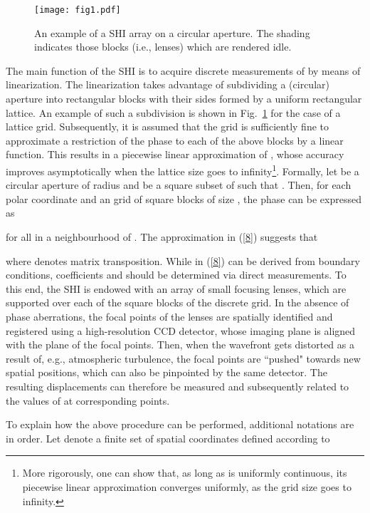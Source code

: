 \pdfoutput=1 \documentclass[journal]{IEEEtran}
\begin{document}
\begin{figure}[!t]
\begin{center}
\hspace{-5mm}\texttt{[image: fig1.pdf]}
\caption{An example of a  SHI array on a circular aperture. The shading indicates those blocks (i.e., lenses) which are rendered idle.} \label{F1}
\end{center}
\end{figure}

The main function of the SHI is to acquire discrete measurements of  by means of linearization. The linearization takes advantage of subdividing a (circular) aperture into rectangular blocks with their sides formed by a uniform rectangular lattice. An example of such a subdivision is shown in Fig.~\ref{F1} for the case of a  lattice grid. Subsequently, it is assumed that the grid is sufficiently fine to approximate a restriction of the phase  to each of the above blocks by a linear function. This results in a piecewise linear approximation of , whose accuracy improves asymptotically when the lattice size goes to infinity\footnote{More rigorously, one can show that, as long as  is uniformly continuous, its piecewise linear approximation converges uniformly, as the grid size goes to infinity.}. Formally, let  be a circular aperture of radius  and  be a square subset of  such that . Then, for each polar coordinate  and an  grid of square blocks of size , the phase  can be expressed as

for all  in a neighbourhood of . The approximation in (\ref{8}) suggests that

where  denotes matrix transposition. While  in (\ref{8}) can be derived from boundary conditions, coefficients  and  should be determined via direct measurements. To this end, the SHI is endowed with an array of small focusing lenses, which are supported over each of the square blocks of the discrete grid. In the absence of phase aberrations, the focal points of the lenses are spatially identified and registered using a high-resolution CCD detector, whose imaging plane is aligned with the plane of the focal points. Then, when the wavefront gets distorted as a result of, e.g., atmospheric turbulence, the focal points are ``pushed" towards new spatial positions, which can also be pinpointed by the same detector. The resulting displacements can therefore be measured and subsequently related to the values of  at corresponding points.

To explain how the above procedure can be performed, additional notations are in order. Let  denote a finite set of spatial coordinates defined according to
\end{document}
